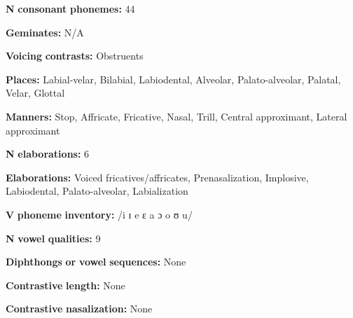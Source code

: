 \documentclass[output=paper]{langsci/langscibook}
\begin{document}
\begin{styleBody}
\textbf{N} \textbf{consonant} \textbf{phonemes:} 44
\end{styleBody}

\begin{styleBody}
\textbf{Geminates:} N/A
\end{styleBody}

\begin{styleBody}
\textbf{Voicing} \textbf{contrasts:} Obstruents
\end{styleBody}

\begin{styleBody}
\textbf{Places:} Labial-velar, Bilabial, Labiodental, Alveolar, Palato-alveolar, Palatal, Velar, Glottal
\end{styleBody}

\begin{styleBody}
\textbf{Manners:} Stop, Affricate, Fricative, Nasal, Trill, Central approximant, Lateral approximant
\end{styleBody}

\begin{styleBody}
\textbf{N} \textbf{elaborations:} 6
\end{styleBody}

\begin{styleBody}
\textbf{Elaborations:} Voiced fricatives/affricates, Prenasalization, Implosive, Labiodental, Palato-alveolar, Labialization
\end{styleBody}

\begin{styleBody}
\textbf{V} \textbf{phoneme} \textbf{inventory:} /i ɪ e ɛ a ɔ o ʊ u/
\end{styleBody}

\begin{styleBody}
\textbf{N} \textbf{vowel} \textbf{qualities:} 9
\end{styleBody}

\begin{styleBody}
\textbf{Diphthongs} \textbf{or} \textbf{vowel} \textbf{sequences:} None
\end{styleBody}

\begin{styleBody}
\textbf{Contrastive} \textbf{length:} None
\end{styleBody}

\begin{styleBody}
\textbf{Contrastive} \textbf{nasalization:} None
\end{styleBody}
\end{document}
